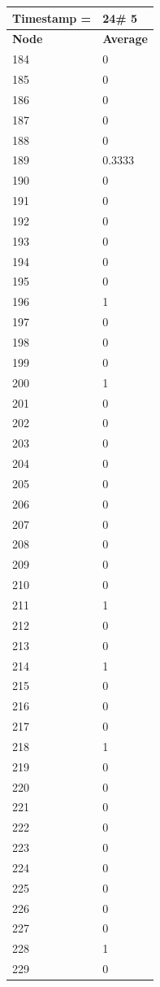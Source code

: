 \begin{tabular}{|l||l|}
\hline
\textbf{Timestamp =} & \textbf{24}\# 5\\\hline
	\textbf{Node} & \textbf{Average} \\ \hline
\hline
	184 & 0 \\ \hline
	185 & 0 \\ \hline
	186 & 0 \\ \hline
	187 & 0 \\ \hline
	188 & 0 \\ \hline
	189 & 0.3333 \\ \hline
	190 & 0 \\ \hline
	191 & 0 \\ \hline
	192 & 0 \\ \hline
	193 & 0 \\ \hline
	194 & 0 \\ \hline
	195 & 0 \\ \hline
	196 & 1 \\ \hline
	197 & 0 \\ \hline
	198 & 0 \\ \hline
	199 & 0 \\ \hline
	200 & 1 \\ \hline
	201 & 0 \\ \hline
	202 & 0 \\ \hline
	203 & 0 \\ \hline
	204 & 0 \\ \hline
	205 & 0 \\ \hline
	206 & 0 \\ \hline
	207 & 0 \\ \hline
	208 & 0 \\ \hline
	209 & 0 \\ \hline
	210 & 0 \\ \hline
	211 & 1 \\ \hline
	212 & 0 \\ \hline
	213 & 0 \\ \hline
	214 & 1 \\ \hline
	215 & 0 \\ \hline
	216 & 0 \\ \hline
	217 & 0 \\ \hline
	218 & 1 \\ \hline
	219 & 0 \\ \hline
	220 & 0 \\ \hline
	221 & 0 \\ \hline
	222 & 0 \\ \hline
	223 & 0 \\ \hline
	224 & 0 \\ \hline
	225 & 0 \\ \hline
	226 & 0 \\ \hline
	227 & 0 \\ \hline
	228 & 1 \\ \hline
	229 & 0 \\ \hline
\end{tabular}
